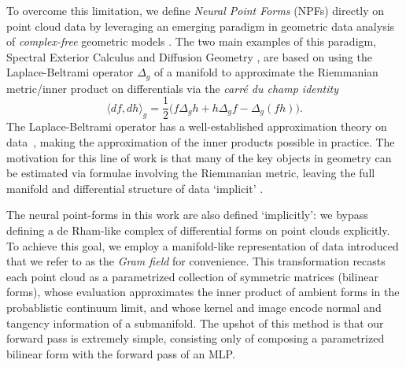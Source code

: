 \documentclass{article}
\newcommand{\jake}[1]{}
\theoremstyle{remark}
\theoremstyle{plain}
\begin{document}


To overcome this limitation, we define \textit{Neural Point Forms} (NPFs) directly on point cloud data by leveraging an emerging paradigm in geometric data analysis of \textit{complex-free} geometric models \cite{jonesComputingDiffusionGeometry2026}. The two main examples of this paradigm, Spectral Exterior Calculus \cite{giannakis-berry2020} and Diffusion Geometry \cite{jones2024diffusiongeometry}, are based on using the Laplace-Beltrami operator $\Delta_g$ of a manifold to approximate the Riemmanian metric/inner product on differentials via the \textit{carré du champ identity}
\begin{equation} \label{smooth-carre-du-champ}
   \langle df, dh \rangle_g = \dfrac{1}{2} \Big( f \Delta_g h + h \Delta_g f - \Delta_g(fh) \Big).
\end{equation} The Laplace-Beltrami operator has a well-established approximation theory on data~\cite{coifman2006diffusion, Berry2016, Belkin2008, singer2006graph}, making the approximation of the inner products possible in practice. The motivation for this line of work is that many of the key objects in geometry can be estimated via formulae involving the Riemmanian metric, leaving the full manifold and differential structure of data `implicit' \cite{kawasaki2026diffusion}. 

The neural point-forms in this work are also defined `implicitly': we bypass defining a de Rham-like complex of differential forms on point clouds explicitly. To achieve this goal, we employ a manifold-like representation of data introduced \cite{jones2026manifolddiffusiongeometrycurvature,jonesComputingDiffusionGeometry2026} that we refer to as the \textit{Gram field} for convenience. This transformation recasts each point cloud as a parametrized collection of symmetric matrices (bilinear forms), whose evaluation approximates the inner product of ambient forms in the probablistic continuum limit, and whose kernel and image encode normal and tangency information of a submanifold. The upshot of this method is that our forward pass is extremely simple, consisting only of composing a parametrized bilinear form with the forward pass of an MLP.
\end{document}
